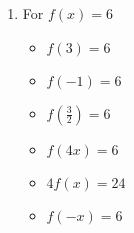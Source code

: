 \documentclass{ximera}
\begin{document}
\begin{enumerate}
\begin{multicols}{3}
\begin{itemize}
\item $f(3) = 2$
\item $f(-1) = 6$
\item $f\left(\frac{3}{2} \right) = -\frac{1}{4}$
\end{itemize}
\end{multicols}

\begin{multicols}{3}
\begin{itemize}
\item  $f(4x) = 16x^2-12x+2$
\item $4f(x) = 4x^2-12x+8$
\item $f(-x) = x^2+3x+2$
\end{itemize}
\end{multicols}

\begin{multicols}{3}
\begin{itemize}
\item  $f(x-4) = x^2-11x+30$
\item $f(x) - 4 = x^2-3x-2$
\item  $f\left(x^2\right) = x^4-3x^2+2$
\end{itemize}
\end{multicols}



\item For $f(x) = 6$ 

\begin{multicols}{3}
\begin{itemize}
\item $f(3) = 6$
\item $f(-1) =6$
\item $f\left(\frac{3}{2} \right) = 6$
\end{itemize}
\end{multicols}

\begin{multicols}{3}
\begin{itemize}
\item  $f(4x) = 6$
\item $4f(x) = 24$
\item $f(-x) = 6$
\end{itemize}
\end{multicols}

\begin{multicols}{3}
\begin{itemize}


\end{itemize}
\end{multicols}
\end{enumerate}
\end{document}
